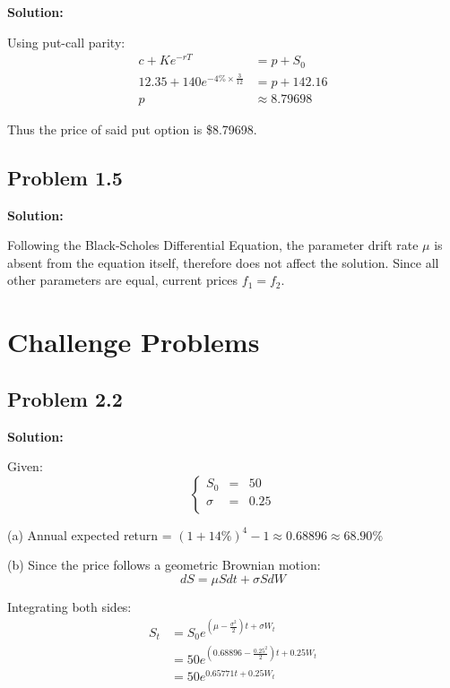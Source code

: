 \documentclass[openany, amssymb, psamsfonts]{amsart}
\theoremstyle{definition}
\numberwithin{equation}{section}
\begin{document}
\noindent \textbf{Solution:}

Using put-call parity:
\begin{align*}
  c + Ke^{-rT} &= p + S_0 \\
  12.35 + 140e^{-4 \% \times \frac{3}{12}} &= p + 142.16 \\
  p &\approx 8.79698
\end{align*}

Thus the price of said put option is \$8.79698.
\subsection*{Problem 1.5} \mbox{}

\noindent\textbf{Solution:}

Following the Black-Scholes Differential Equation, the parameter drift rate $\mu$ is absent from the equation itself, therefore does not affect the solution. Since all other parameters are equal, current prices $f_1 = f_2$.

\section{Challenge Problems}
\subsection*{Problem 2.2} \mbox{}

\noindent\textbf{Solution:}

Given:
\[
  \left\{
    \begin{array}{ccl}
      S_0 &=&50\\
      \sigma &=& 0.25\\
    \end{array}  
  \right.
\]

(a) Annual expected return = $(1+14\%)^4-1\approx0.68896 \approx 68.90\%$

(b) Since the price follows a geometric Brownian motion:
\[
    dS = \mu Sdt + \sigma SdW
\]

Integrating both sides:
\begin{equation} \label{eq:brownian}
  \begin{split}
    S_t &= S_0e^{(\mu - \frac{\sigma^2}{2})t+\sigma W_t}\\
    &= 50e^{(0.68896-\frac{0.25^2}{2})t + 0.25W_t}\\
    &= 50e^{0.65771t + 0.25W_t}
  \end{split}  
\end{equation}
\end{document}
